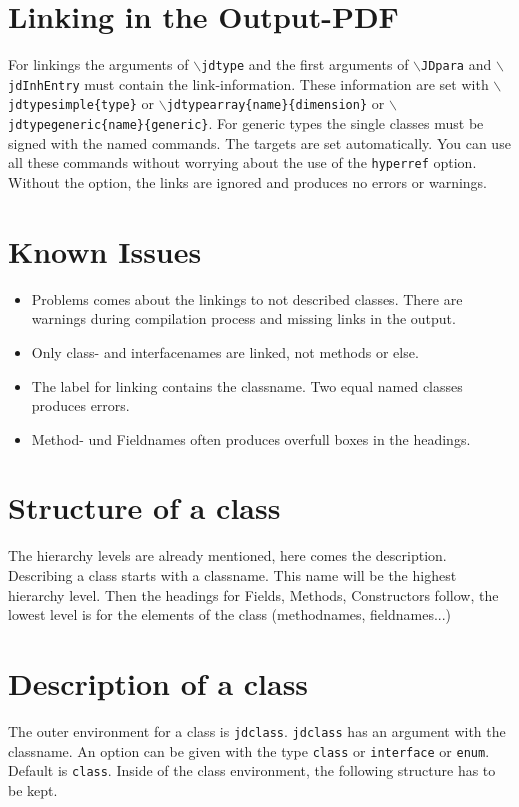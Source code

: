 \documentclass[11pt,a4paper]{article}
\newcommand{\code}[1]{\protect\texttt{#1}}
\newcommand{\befehl}[1]{\code{$\backslash$#1}}
\begin{document}
\section{Linking in the Output-PDF}
For linkings the arguments of \befehl{jdtype} and the first arguments of \befehl{JDpara} and \befehl{jdInhEntry} must contain the link-information. These information are set with \befehl{jdtypesimple\{type\}} or \befehl{jdtypearray\{name\}\{dimension\}} or \befehl{jdtypegeneric\{name\}\{generic\}}. For generic types the single classes must be signed with the named commands. The targets are set automatically. You can use all these commands without worrying about the use of the \code{hyperref} option. Without the option, the links are ignored and produces no errors or warnings.

\section{Known Issues}
\begin{itemize}
	\item Problems comes about the linkings to not described classes. There are warnings during compilation process and missing links in the output.
	\item Only class- and interfacenames are linked, not methods or else. 
	\item The label for linking contains the classname. Two equal named classes produces errors.
	\item Method- und Fieldnames often produces overfull boxes in the headings.
\end{itemize}

\section{Structure of a class}
The hierarchy levels are already mentioned, here comes the description. Describing a class starts with a classname. This name will be the highest hierarchy level. Then the headings for Fields, Methods, Constructors follow, the lowest level is for the elements of the class (methodnames, fieldnames...)

\section{Description of a class}
The outer environment for a class is \code{jdclass}. \code{jdclass} has an argument with the classname. An option can be given with the type \code{class} or \code{interface} or \code{enum}. Default is \code{class}. Inside of the class environment, the following structure has to be kept.
\end{document}
